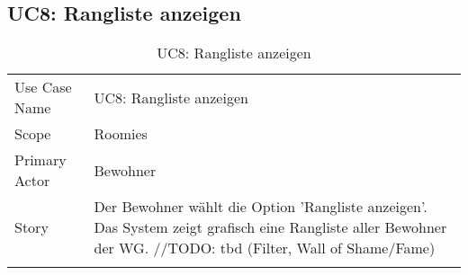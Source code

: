 \subsection{UC8: Rangliste anzeigen}
\begin{table}[H]
	\tablestyle
	\tablealtcolored
	\begin{tabularx}{\textwidth}{lX}
		\tablebody
			Use Case Name &
			UC8: Rangliste anzeigen
			\tabularnewline
			Scope &
			Roomies
			\tabularnewline
			Primary Actor &
			Bewohner
			\tabularnewline
			Story &
			Der Bewohner wählt die Option 'Rangliste anzeigen'. Das System zeigt grafisch eine Rangliste aller Bewohner der WG. \newline //TODO: tbd (Filter, Wall of Shame/Fame)
			\tabularnewline
		\tableend
	\end{tabularx}
	\caption{UC8: Rangliste anzeigen}
\end{table}


